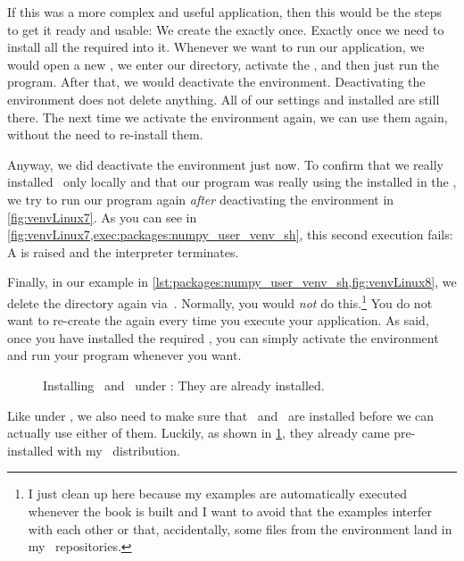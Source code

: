 If this was a more complex and useful application, then this would be the steps to get it ready and usable:
We create the  exactly once.
Exactly once we need to install all the required  into it.
Whenever we want to run our application, we would open a new , we enter our directory, activate the , and then just run the program.
After that, we would deactivate the environment.
Deactivating the environment does not delete anything.
All of our settings and installed  are still there.
The next time we activate the environment again, we can use them again, without the need to re-install them.

Anyway, we did deactivate the environment just now.
To confirm that we really installed \numpy\ only locally and that our program was really using the  installed in the , we try to run our program again \emph{after} deactivating the environment in \cref{fig:venvLinux7}.
As you can see in \cref{fig:venvLinux7,exec:packages:numpy_user_venv_sh}, this second execution fails:
A  is raised and the interpreter terminates.%
%
\begin{sloppypar}%
Finally, in our example in \cref{lst:packages:numpy_user_venv_sh,fig:venvLinux8}, we delete the  directory again via~.
Normally, you would \emph{not} do this.\footnote{%
I just clean up here because my examples are automatically executed whenever the book is built and I want to avoid that the examples interfer with each other or that, accidentally, some files from the environment land in my \git\ repositories.}
You do not want to re-create the  again every time you execute your application.
As said, once you have installed the required , you can simply activate the environment and run your program whenever you want.%
\end{sloppypar}%
%
\FloatBarrier%
\endhsection%
%
%
%
\begin{figure}%
\centering%
%
\caption{Installing \pip\ and \venv\ under \microsoftWindows: They are already installed.}%
\label{fig:installPipVenvWindows}%
\end{figure}%
%
Like under \linux, we also need to make sure that \pip\ and \venv\ are installed before we can actually use either of them.
Luckily, as shown in \cref{fig:installPipVenvWindows}, they already came pre-installed with my \python\ distribution.

